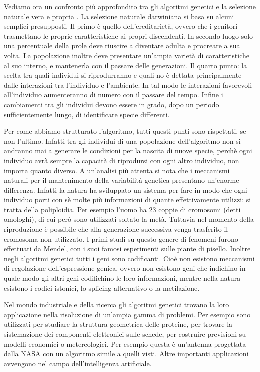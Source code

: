 \documentclass[a4paper, 11pt, onecolumn]{article}
\newcommand*{\MyMarginNoteFormat}{%
    \scriptsize \bfseries \leavevmode \color{mgray}%
}
\newcommand{\margin}[1]{%
    \marginpar
        [\raggedleft  \MyMarginNoteFormat #1]%
        {\raggedright \MyMarginNoteFormat #1}%
}
\newcommand{\slide}{\margin{Slide}}
\begin{document}
Vediamo ora un confronto pi\`u approfondito tra gli algoritmi genetici e la
selezione naturale vera e propria\slide. La selezione naturale darwiniana si
basa su alcuni semplici presupposti. \slide Il primo \`e quello
dell'ereditariet\`a, ovvero che i genitori trasmettano le proprie
caratteristiche ai propri discendenti. In secondo luogo solo una percentuale
della prole deve riuscire a diventare adulta e procreare a sua volta. La
popolazione inoltre deve presentare un'ampia variet\`a di caratteristiche al suo
interno, e mantenerla con il passare delle  generazioni. Il quarto punto: la
scelta tra quali individui si riprodurranno e  quali no \`e dettata
principalmente dalle interazioni tra l'individuo e l'ambiente. In tal modo le
interazioni favorevoli all'individuo aumenteranno di numero con  il passare del
tempo. Infine i cambiamenti tra gli individui devono essere in grado, dopo un
periodo sufficientemente lungo, di identificare specie differenti.

Per come abbiamo strutturato l'algoritmo, tutti questi punti sono rispettati, se
non l'ultimo. Infatti tra gli individui di una popolazione dell'algoritmo non si
andranno mai a generare le condizioni per la nascita di nuove specie, perch\`e
ogni individuo avr\`a sempre la capacit\`a di riprodursi con ogni altro
individuo, non importa quanto diverso. A un'analisi pi\`u attenta si nota che i
meccanismi naturali per il mantenimento della variabilit\`a genetica  presentano
un'enorme differenza. Infatti la natura ha sviluppato un sistema per  fare in
modo che ogni individuo porti con s\`e molte pi\`u informazioni di quante
effettivamente utilizzi: si tratta della poliploidia. Per esempio l'uomo ha  23
coppie di cromosomi (detti omologhi), di cui per\`o sono utilizzati soltato la
met\`a. Tuttavia nel momento della riproduzione \`e possibile che alla
generazione successiva venga trasferito il cromosoma non utilizzato. I primi
studi su questo genere di fenomeni furono effettuati da Mendel, con i suoi
famosi esperimenti sulle piante di pisello. Inoltre negli algoritmi genetici
tutti i geni sono codificanti. Cio\`e non esistono meccanismi di regolazione
dell'espressione genica, ovvero non esistono geni che indichino in quale modo
gli altri geni codifichino le loro informazioni, mentre nella natura esistono
i codici istonici, lo splicing alternativo o la metilazione.

Nel mondo industriale e della ricerca gli algoritmi genetici trovano la loro
applicazione nella risoluzione di un'ampia gamma di problemi. Per esempio sono
utilizzati per studiare la struttura geometrica delle proteine, per trovare la
sistemazione dei componenti elettronici sulle schede, per costruire previsioni
su modelli economici o metereologici. Per esempio questa \`e un'antenna
progettata dalla NASA con un algoritmo simile a quelli visti. Altre importanti
applicazioni avvengono nel campo dell'intelligenza artificiale.
\end{document}
